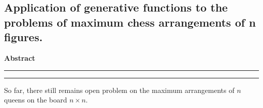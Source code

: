 \documentclass[a4paper,12pt]{article}
\begin{document}


\begin{large}

\begin{center}
\section*{Application of generative functions to the problems of maximum chess arrangements of n figures.}
\end{center}

\medskip

\begin{center}
\textbf{Abstract}
\end{center}


\hrule height 1pt
\vskip 3pt \hrule

\medskip
\medskip






So far, there still remains open problem on the maximum arrangements of $n$ queens on the board $n\times n$.


\end{large}
\end{document}
